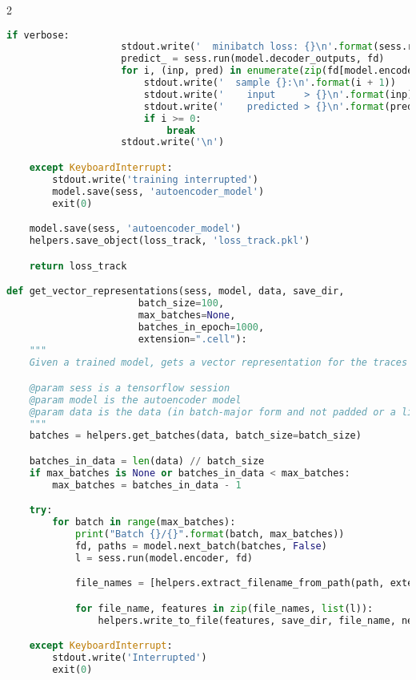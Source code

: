 \begin{landscape}
\begin{multicols}{2}
\begin{lstlisting}[language=Python]
                if verbose:
                    stdout.write('  minibatch loss: {}\n'.format(sess.run(model.loss, fd)))
                    predict_ = sess.run(model.decoder_outputs, fd)
                    for i, (inp, pred) in enumerate(zip(fd[model.encoder_inputs].swapaxes(0, 1), predict_.swapaxes(0, 1))):
                        stdout.write('  sample {}:\n'.format(i + 1))
                        stdout.write('    input     > {}\n'.format(inp))
                        stdout.write('    predicted > {}\n'.format(pred))
                        if i >= 0:
                            break
                    stdout.write('\n')

    except KeyboardInterrupt:
        stdout.write('training interrupted')
        model.save(sess, 'autoencoder_model')
        exit(0)

    model.save(sess, 'autoencoder_model')
    helpers.save_object(loss_track, 'loss_track.pkl')

    return loss_track

def get_vector_representations(sess, model, data, save_dir,
                       batch_size=100,
                       max_batches=None,
                       batches_in_epoch=1000,
                       extension=".cell"):
    """
    Given a trained model, gets a vector representation for the traces in batch

    @param sess is a tensorflow session
    @param model is the autoencoder model
    @param data is the data (in batch-major form and not padded or a list of files (depending on `in_memory`))
    """
    batches = helpers.get_batches(data, batch_size=batch_size)

    batches_in_data = len(data) // batch_size
    if max_batches is None or batches_in_data < max_batches:
        max_batches = batches_in_data - 1

    try:
        for batch in range(max_batches):
            print("Batch {}/{}".format(batch, max_batches))
            fd, paths = model.next_batch(batches, False)
            l = sess.run(model.encoder, fd)

            file_names = [helpers.extract_filename_from_path(path, extension) for path in paths]

            for file_name, features in zip(file_names, list(l)):
                helpers.write_to_file(features, save_dir, file_name, new_extension=".cellf")

    except KeyboardInterrupt:
        stdout.write('Interrupted')
        exit(0)


\end{lstlisting}
\end{multicols}
\end{landscape}
